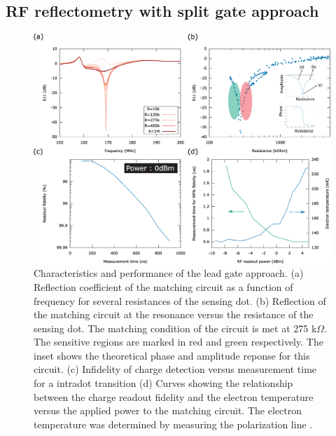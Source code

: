 \documentclass{article}
\begin{document}
\subsection{RF reflectometry with split gate approach}

	\begin{figure}
		\includegraphics[width=\textwidth]{figures/Performance_figure/perfomance_fig_w_inset.eps}
		\caption{Characteristics and performance of the lead gate approach. (a) Reflection coefficient of the matching circuit as a function of frequency for several resistances of the sensing dot. (b) Reflection of the matching circuit at the resonance versus the resistance of the sensing dot. The matching condition of the circuit is met at 275 k$\Omega$. The sensitive regions are marked in red and green respectively. The inset shows the theoretical phase and amplitude reponse for this circuit. (c) Infidelity of charge detection versus measurement time for a intradot transition (d) Curves showing the relationship between the charge readout fidelity and the electron temperature versus the applied power to the matching circuit. The electron temperature was determined by measuring the polarization line \cite{van2018automated}. }
		\label{fig:lead_gate_result}
	\end{figure}	
\end{document}

